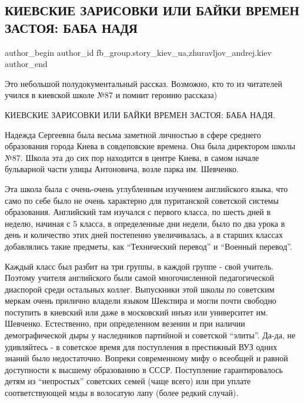  
 
 
 
 
 
\subsection{КИЕВСКИЕ ЗАРИСОВКИ ИЛИ БАЙКИ ВРЕМЕН ЗАСТОЯ: БАБА НАДЯ}
\label{sec:29_07_2020.fb.fb_group.story_kiev_ua.1.baba_nadja}
 
\ifcmt
 author_begin
   author_id fb_group.story_kiev_ua,zhuravljov_andrej.kiev
 author_end
\fi

Это небольшой полудокументальный рассказ. Возможно, кто то из читателей учился
в киевской школе №87 и помнит героиню рассказа)

КИЕВСКИЕ ЗАРИСОВКИ ИЛИ БАЙКИ ВРЕМЕН ЗАСТОЯ: БАБА НАДЯ.

Надежда Сергеевна была весьма заметной личностью в сфере среднего образования
города Киева в совдеповские времена. Она была директором школы №87. Школа эта
до сих пор находится в центре Киева, в самом начале бульварной части улицы
Антоновича, возле парка им. Шевченко. 


Эта школа была с очень-очень углубленным изучением английского языка, что само
по себе было не очень характерно для пуританской советской системы образования.
Английский там изучался с первого класса, по шесть дней в неделю, начиная с 5
класса, в определенные дни недели, было по два урока в день и количество этих
дней постепенно увеличивалась, а в старших классах добавлялись такие предметы,
как \enquote{Технический перевод} и \enquote{Военный перевод}. 

Каждый класс был разбит на три группы, в каждой группе -
свой учитель. Поэтому учителя английского были самой многочисленной
педагогической диаспорой среди остальных коллег. Выпускники этой школы по
советским меркам очень прилично владели языком Шекспира и могли почти свободно
поступить в киевский или даже в московский инъяз или университет им. Шевченко.
Естественно, при определенном везении и при наличии демографической дыры у
наследников партийной и советской \enquote{элиты}. Да-да, не удивляйтесь - в советское
время для поступления в престижный ВУЗ одних знаний было недостаточно. Вопреки
современному мифу о всеобщей и равной доступности к высшему образованию в СССР.
Поступление гарантировалось детям из \enquote{непростых} советских семей (чаще всего)
или при уплате соответствующей мзды в волосатую лапу (более редкий случай).

